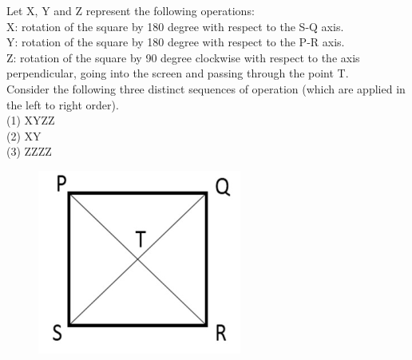 \documentclass[journal,12pt,onecolumn]{IEEEtran}
\theoremstyle{remark}
\begin{document}
Let X, Y and Z represent the following operations: \\
X: rotation of the square by 180 degree with respect to the S-Q axis.\\
Y: rotation of the square by 180 degree with respect to the P-R axis.\\
Z: rotation of the square by 90 degree clockwise with respect to the axis perpendicular, going into the screen and passing through the point T.\\
Consider the following three distinct sequences of operation (which are applied in the left to right order).\\
(1) XYZZ \\
(2) XY \\
(3) ZZZZ \\
\begin{figure}[H]
	 	\centering
	 	\includegraphics[width=0.2\linewidth]{figs/screenshot003}
	 	\caption{}
	 	\label{fig:screenshot003}
	 	\end{figure}
	 
\end{document}
